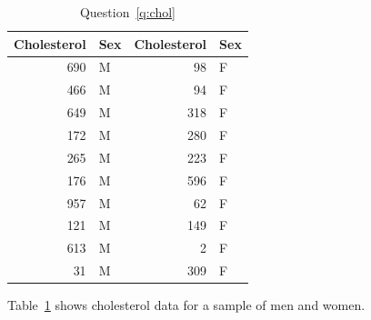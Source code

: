 \documentclass[letterpaper, landscape]{exam}
\begin{document}
\begin{questions}
    \question{}\label{q:chol}
      \begin{table}[ht]
        \centering
        \begin{tabular}{rlrl}
          \toprule
          Cholesterol & Sex & Cholesterol & Sex \\
          \midrule
          690         & M   & 98          & F \\
          466         & M   & 94          & F \\
          649         & M   & 318         & F \\
          172         & M   & 280         & F \\
          265         & M   & 223         & F \\
          176         & M   & 596         & F \\
          957         & M   & 62          & F \\
          121         & M   & 149         & F \\
          613         & M   & 2           & F \\
           31         & M   & 309         & F \\
          \bottomrule
        \end{tabular}
        \caption{Question~\ref{q:chol}}\label{tab:chol}
      \end{table}

      Table~\ref{tab:chol} shows cholesterol data for a sample of men and women.

\end{questions}
\end{document}
